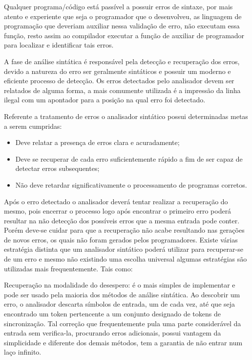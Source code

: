 \documentclass[
	article,			%
	11pt,				%
	oneside,			%
	a4paper,			%
	portuguese,			%
	brazil,				%
	sumario=tradicional
	]{abntex2}
\begin{document}
Qualquer programa/código está passível a possuir erros de sintaxe, por mais atento e experiente que seja o programador que o desenvolveu, as linguagem de programação que deveriam auxiliar nessa validação de erro, não executam essa função, resto assim ao compilador executar a função de auxiliar de programador para localizar e identificar tais erros.  
	
A fase de análise sintática é responsável pela detecção e recuperação dos erros, devido a natureza do erro ser geralmente sintáticos e possuir um moderno e eficiente processo de detecção. Os erros detectados pelo analisador devem ser relatados de alguma forma, a mais comumente utilizada é a impressão da linha ilegal com um apontador para a posição na qual erro foi detectado. 

Referente a tratamento de erros o analisador sintático possui determinadas metas a serem cumpridas:

\begin{itemize}
	\item Deve relatar a presença de erros clara e acuradamente;
	\item Deve se recuperar de cada erro suficientemente rápido a fim de ser capaz de detectar erros subsequentes;
	\item Não deve retardar significativamente o processamento de programas corretos. 
\end{itemize}

Após o erro detectado o analisador deverá tentar realizar a recuperação do mesmo, pois encerrar o processo logo após encontrar o primeiro erro poderá resultar na não detecção dos possíveis erros que a mesma entrada pode conter. Porém deve-se cuidar para que a recuperação não acabe resultando nas gerações de novos erros, os quais não foram gerados pelos programadores. Existe várias estratégia distinta que um analisador sintático poderá utilizar para recuperar-se de um erro e mesmo não existindo uma escolha universal algumas estratégias são utilizadas mais frequentemente. Tais como: 

Recuperação na modalidade do desespero: é o mais simples de implementar e pode ser usado pela maioria dos métodos de análise sintática. Ao descobrir um erro, o analisador descarta símbolos de entrada, um de cada vez, até que seja encontrado um token pertencente a um conjunto designado de tokens de sincronização. Tal correção que frequentemente pula uma parte considerável da entrada sem verifica-la, procurando erros adicionais, possui vantagem da simplicidade e diferente dos demais métodos, tem a garantia de não entrar num laço infinito.  
\end{document}
